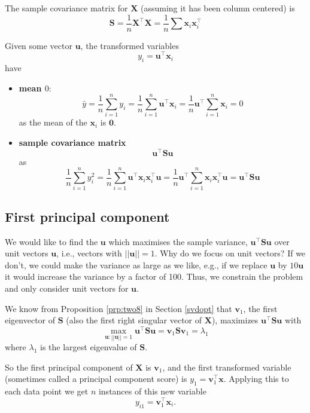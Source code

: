 \documentclass[
]{book}
\theoremstyle{definition}
\theoremstyle{definition}
\theoremstyle{definition}
\theoremstyle{definition}
\theoremstyle{remark}
\begin{document}
The sample covariance matrix for \(\mathbf X\) (assuming it has been column centered) is
\[\mathbf S= \frac{1}{n}\mathbf X^\top \mathbf X= \frac{1}{n}\sum \mathbf x_i\mathbf x_i^\top\]

Given some vector \(\mathbf u\), the transformed variables
\[y_i = \mathbf u^\top \mathbf x_i\]
have

\begin{itemize}
\item
  \textbf{mean \(0\)}:
  \[\bar{y}= \frac{1}{n}\sum_{i=1}^n y_i = \frac{1}{n}\sum_{i=1}^n \mathbf u^\top \mathbf x_i =\frac{1}{n} \mathbf u^\top \sum_{i=1}^n  \mathbf x_i = 0\]
  as the mean of the \(\mathbf x_i\) is \(\boldsymbol 0\).
\item
  \textbf{sample covariance matrix} \[\mathbf u^\top \mathbf S\mathbf u\]
  as
  \[\frac{1}{n} \sum_{i=1}^n y_i^2 = \frac{1}{n} \sum_{i=1}^n \mathbf u^\top \mathbf x_i \mathbf x_i^\top\mathbf u= \frac{1}{n}\mathbf u^\top \sum_{i=1}^n  \mathbf x_i \mathbf x_i^\top \mathbf u= \mathbf u^\top \mathbf S\mathbf u
  \]
\end{itemize}

\hypertarget{first-principal-component}{%
\subsection{First principal component}\label{first-principal-component}}

We would like to find the \(\mathbf u\) which maximises the sample variance, \(\mathbf u^\top \mathbf S\mathbf u\) over unit vectors \(\mathbf u\), i.e., vectors with \(||\mathbf u||=1\). Why do we focus on unit vectors? If we don't, we could make the variance as large as we like, e.g., if we replace \(\mathbf u\) by \(10\mathbf u\) it would increase the variance by a factor of 100. Thus, we constrain the problem and only consider unit vectors for \(\mathbf u\).

We know from Proposition \ref{prp:two8} in Section \ref{svdopt} that \(\mathbf v_1\), the first eigenvector of \(\mathbf S\) (also the first right singular vector of \(\mathbf X\)), maximizes \(\mathbf u^\top \mathbf S\mathbf u\) with
\[  \max_{\mathbf u: ||\mathbf u||=1} \mathbf u^\top \mathbf S\mathbf u= \mathbf v_1 \mathbf S\mathbf v_1 =\lambda_1\]
where \(\lambda_1\) is the largest eigenvalue of \(\mathbf S\).

So the first principal component of \(\mathbf X\) is \(\mathbf v_1\), and the first transformed variable (sometimes called a principal component score) is \(y_1 = \mathbf v_1 ^\top \mathbf x\).
Applying this to each data point we get \(n\) instances of this new variable
\[y_{i1} = \mathbf v_1 ^\top \mathbf x_i.\]
\end{document}
